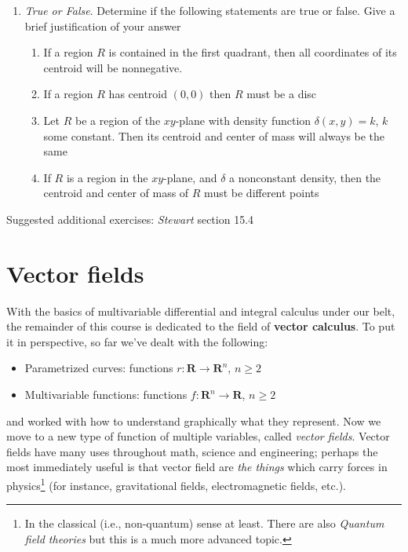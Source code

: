 \documentclass[12pt]{article}
\numberwithin{equation}{subsection}
\numberwithin{figure}{subsection}
\theoremstyle{note}
\begin{document}
{\begin{enumerate}[label=\arabic*.]
\item  \textit{True or False}. Determine if the following statements are true or false. Give a brief justification of your answer

\begin{enumerate}
	\item If a region $R$ is contained in the first quadrant, then all coordinates of its centroid will be nonnegative. 
	\item If a region $R$ has centroid $(0,0)$ then $R$ must be a disc
	\item Let $R$ be a region of the $xy$-plane with density function $\delta(x,y)=k$, $k$ some constant. Then its centroid and center of mass will always be the same
	\item If $R$ is a region in the $xy$-plane, and $\delta$ a  nonconstant density, then the centroid and center of mass of $R$ must be different points

\end{enumerate}
\end{enumerate}
Suggested additional exercises: \textit{Stewart} section 15.4



\section{Vector fields} \label{sec-vector-field}

With the basics of multivariable differential and integral calculus under our belt, the remainder of this course is dedicated to the field of \textbf{vector calculus}. To put it in perspective, so far we've dealt with the following:
\begin{itemize}
	\item Parametrized curves: functions $r\colon \mathbf{R}\to \mathbf{R}^n$, $n\geq 2$
	\item Multivariable functions: functions $f\colon \mathbf{R}^n\to \mathbf{R}$, $n\geq 2$
\end{itemize} and worked with how to understand graphically what they represent. Now we move to a new type of function of multiple variables, called \textit{vector fields}. Vector fields have many uses throughout math, science and engineering; perhaps the most immediately useful is that vector field are \textit{the things} which carry forces in physics\footnote{In the classical (i.e., non-quantum) sense at least. There are also \textit{Quantum field theories} but this is a much more advanced topic.} (for instance, gravitational fields, electromagnetic fields, etc.).

}
\end{document}
